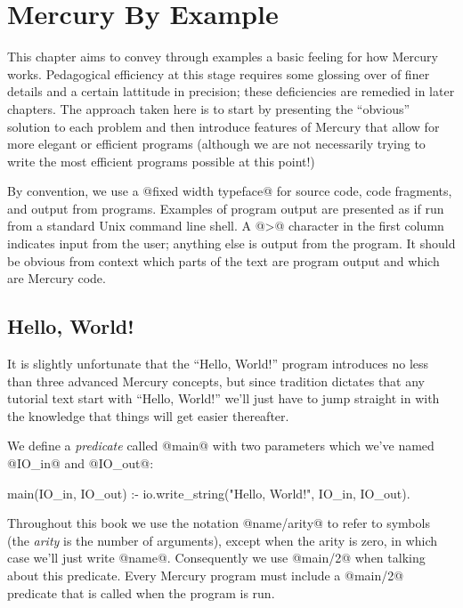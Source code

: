 
\chapter{Mercury By Example}

This chapter aims to convey through examples a basic feeling for how
Mercury works.  Pedagogical efficiency at this stage requires some glossing
over of finer details and a certain lattitude in precision; these
deficiencies are remedied in later chapters.  The approach taken here is to
start by presenting the ``obvious'' solution to each problem and then
introduce features of Mercury that allow for more elegant or efficient
programs (although we are not necessarily trying to write the most efficient
programs possible at this point!)

By convention, we use a @fixed width typeface@ for source code, code
fragments, and output from programs.  Examples of program output are
presented as if run from a standard Unix command line shell.   A @>@ character in the first column
indicates input from the user; anything else is output from the program.  It
should be obvious from context which parts of the text are program output
and which are Mercury code.



\section{Hello, World!}

It is slightly unfortunate that the ``Hello, World!'' program introduces
no less than three advanced Mercury concepts, but since tradition
dictates that any tutorial text start with ``Hello, World!'' we'll just
have to jump straight in with the knowledge that things will get easier
thereafter.

We define a \emph{predicate} called @main@ with two parameters which
we've named @IO_in@ and @IO_out@:
\begin{myverbatim}
main(IO_in, IO_out) :-
    io.write_string("Hello, World!\n", IO_in, IO_out).
\end{myverbatim}
Throughout this book we use the notation @name/arity@ to refer to symbols
(the \emph{arity} is the number of arguments), except when the arity is
zero, in which case we'll just write @name@.  Consequently we use @main/2@
when talking about this predicate.  Every Mercury program must include a
@main/2@ predicate that is called when the program is run.


